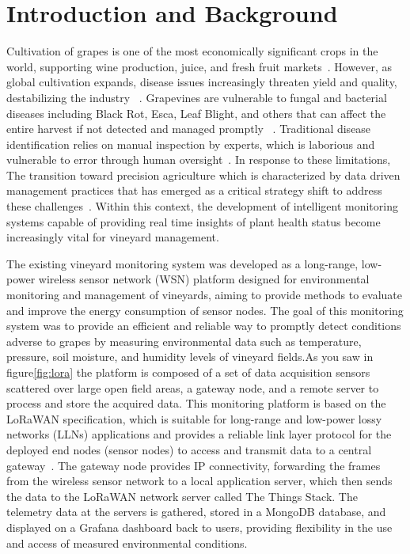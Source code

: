 \chapter{Introduction and Background}
\label{chap:introduction}
Cultivation of grapes is one of the most economically significant crops in the world, supporting wine production, juice, and fresh fruit markets~\cite{mathew2025real}. However, as global cultivation expands, disease issues increasingly threaten yield and quality, destabilizing the industry ~\cite{liu2025grape, mathew2025real}. Grapevines are vulnerable to fungal and bacterial diseases including Black Rot, Esca, Leaf Blight, and others that can affect the entire harvest if not detected and managed promptly ~\cite{mathew2025real, talaat2025deepleaf, zhou2025lightweight, atesoglu2025detection}. Traditional disease identification relies on manual inspection by experts, which is laborious and vulnerable to error through human oversight~\cite{dharrao2025efficient}. In response to these limitations, The transition toward precision agriculture which is characterized by data driven management practices that has emerged as a critical strategy shift to address these challenges~\cite{hnatiuc2023intelligent, aher2025deep}. Within this context, the development of intelligent monitoring systems capable of providing real time insights of plant health status become increasingly vital for vineyard management.

The existing vineyard monitoring system was developed as a long-range, low-power wireless sensor network (WSN) platform designed for environmental monitoring and management of vineyards, aiming to provide methods to evaluate and improve the energy consumption of sensor nodes. The goal of this monitoring system was to provide an efficient and reliable way to promptly detect conditions adverse to grapes by measuring environmental data such as temperature, pressure, soil moisture, and humidity levels of vineyard fields.As you saw  in figure\ref{fig:lora} the platform is composed of a set of data acquisition sensors scattered over large open field areas, a gateway node, and a remote server to process and store the acquired data. This monitoring platform is based on the LoRaWAN specification, which is suitable for long-range and low-power lossy networks (LLNs) applications and provides a reliable link layer protocol for the deployed end nodes (sensor nodes) to access and transmit data to a central gateway~\cite{almufareh2024intelligent, jose2025lorawan}. The gateway node provides IP connectivity, forwarding the frames from the wireless sensor network to a local application server, which then sends the data to the LoRaWAN network server called The Things Stack. The telemetry data at the servers is gathered, stored in a MongoDB database, and displayed on a Grafana dashboard back to users, providing flexibility in the use and access of measured environmental conditions.

